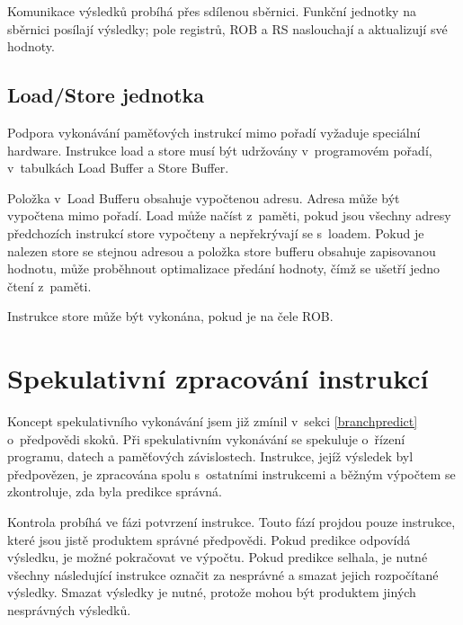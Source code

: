 Komunikace výsledků probíhá přes sdílenou sběrnici.
Funkční jednotky na sběrnici posílají výsledky; pole registrů, ROB a RS naslouchají a aktualizují své hodnoty.

\subsection{Load/Store jednotka}
\label{ooo_ls}

Podpora vykonávání paměťových instrukcí mimo pořadí vyžaduje speciální hardware.
Instrukce load a store musí být udržovány v~programovém pořadí, v~tabulkách Load Buffer a Store Buffer.

Položka v~Load Bufferu obsahuje vypočtenou adresu.
Adresa může být vypočtena mimo pořadí.
Load může načíst z~paměti, pokud jsou všechny adresy předchozích instrukcí store vypočteny a nepřekrývají se s~loadem.
Pokud je nalezen store se stejnou adresou a položka store bufferu obsahuje zapisovanou hodnotu, může proběhnout optimalizace předání hodnoty, čímž se ušetří jedno čtení z~paměti.

Instrukce store může být vykonána, pokud je na čele ROB.

\section{Spekulativní zpracování instrukcí}


Koncept spekulativního vykonávání jsem již zmínil v~sekci \ref{branchpredict} o~předpovědi skoků.
Při spekulativním vykonávání se spekuluje o~řízení programu, datech a paměťových závislostech.
Instrukce, jejíž výsledek byl předpovězen, je zpracována spolu s~ostatními instrukcemi a běžným výpočtem se zkontroluje, zda byla predikce správná. \cite{QuantApproach}

Kontrola probíhá ve fázi potvrzení instrukce.
Touto fází projdou pouze instrukce, které jsou jistě produktem správné předpovědi.
Pokud predikce odpovídá výsledku, je možné pokračovat ve výpočtu.
Pokud predikce selhala, je nutné všechny následující instrukce označit za nesprávné a smazat jejich rozpočítané výsledky.
Smazat výsledky je nutné, protože mohou být produktem jiných nesprávných výsledků.

